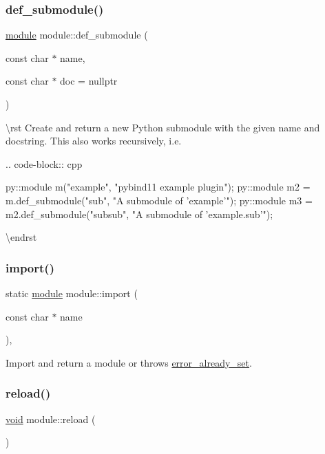 \subsubsection{\texorpdfstring{def\_submodule()}{def\_submodule()}}
{\footnotesize\ttfamily \mbox{\hyperlink{classmodule}{module}} module\+::def\+\_\+submodule (\begin{DoxyParamCaption}\item[{const char $\ast$}]{name,  }\item[{const char $\ast$}]{doc = {\ttfamily nullptr} }\end{DoxyParamCaption})\hspace{0.3cm}{\ttfamily [inline]}}

\textbackslash{}rst Create and return a new Python submodule with the given name and docstring. This also works recursively, i.\+e.

.. code-\/block\+:: cpp \begin{DoxyVerb}py::module m("example", "pybind11 example plugin");
py::module m2 = m.def_submodule("sub", "A submodule of 'example'");
py::module m3 = m2.def_submodule("subsub", "A submodule of 'example.sub'");
\end{DoxyVerb}
 \textbackslash{}endrst \mbox{\label{classmodule_a40817edef0ded5727701534bcded9982}} 
\subsubsection{\texorpdfstring{import()}{import()}}
{\footnotesize\ttfamily static \mbox{\hyperlink{classmodule}{module}} module\+::import (\begin{DoxyParamCaption}\item[{const char $\ast$}]{name }\end{DoxyParamCaption})\hspace{0.3cm}{\ttfamily [inline]}, {\ttfamily [static]}}



Import and return a module or throws {\ttfamily \mbox{\hyperlink{classerror__already__set}{error\+\_\+already\+\_\+set}}}. 

\mbox{\label{classmodule_a6ca13662c15143718888ae5cb13094b0}} 
\subsubsection{\texorpdfstring{reload()}{reload()}}
{\footnotesize\ttfamily \mbox{\hyperlink{_s_d_l__opengles2__gl2ext_8h_ae5d8fa23ad07c48bb609509eae494c95}{void}} module\+::reload (\begin{DoxyParamCaption}{ }\end{DoxyParamCaption})\hspace{0.3cm}{\ttfamily [inline]}}



